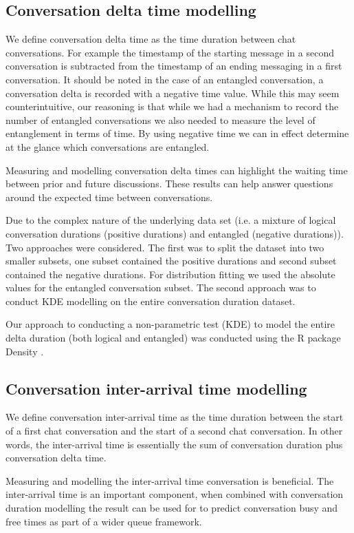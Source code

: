 \documentclass[conference]{IEEEtran}
\begin{document}
\subsection{Conversation delta time modelling}

We define conversation delta time as the time duration between chat conversations. For example the timestamp of the starting message in a second conversation is subtracted from the timestamp of an ending messaging in a first conversation. It should be noted in the case of an entangled conversation, a conversation delta is recorded with a negative time value. While this may seem counterintuitive, our reasoning is that while we had a mechanism to record the number of entangled conversations we also needed to measure the level of entanglement in terms of time. By using negative time we can in effect determine at the glance which conversations are entangled.

Measuring and modelling conversation delta times can highlight the waiting time between prior and future discussions. These results can help answer questions around the expected time between conversations. 

Due to the complex nature of the underlying data set (i.e. a mixture of logical conversation durations (positive durations) and entangled (negative durations)). Two approaches were considered. The first was to split the dataset into two smaller subsets, one subset contained the positive durations and second subset contained the negative durations. For distribution fitting we used the absolute values for the entangled conversation subset. The second approach was to conduct KDE modelling on the entire conversation duration dataset. 

Our approach to conducting a non-parametric test (KDE) to model the entire delta duration (both logical and entangled) was conducted using the R package Density \cite{Rdensity}. 

\subsection{Conversation inter-arrival time modelling}

We define conversation inter-arrival time as the time duration between the start of a first chat conversation and the start of a second chat conversation. In other words, the inter-arrival time is essentially the sum of conversation duration plus conversation delta time.  

Measuring and modelling the inter-arrival time conversation is beneficial.  The inter-arrival time is an important component, when combined with conversation duration modelling the result can be used for to predict conversation busy and free times as part of a wider queue framework.
\end{document}
